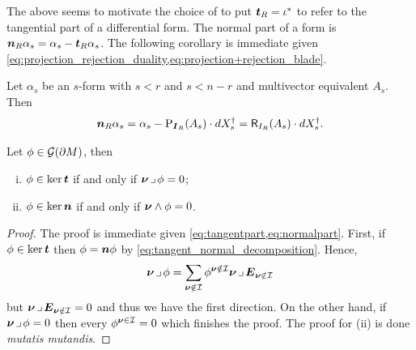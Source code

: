 \documentclass{article}
\begin{document}
The above seems to motivate the choice of \cite{schwarz_hodge_1995} to put $\boldsymbol{t}_R = \iota^*$ to refer to the tangential part of a differential form. The normal part of a form is $\boldsymbol{n}_R \alpha_s = \alpha_s - \boldsymbol{t}_R \alpha_s$. The following corollary is immediate given \cref{eq:projection_rejection_duality,eq:projection+rejection_blade}. 
\begin{corollary}
Let $\alpha_s$ be an $s$-form with $s<r$ and $s<n-r$ and multivector equivalent $A_s$. Then
\begin{equation}
\boldsymbol{n}_R \alpha_s = \alpha_s - \operatorname{P}_{\boldsymbol{I}_R}(A_s)\cdot dX_s^\dagger = \mathsf{R}_{I_R}(A_s)\cdot dX_s^\dagger.
\end{equation}
\end{corollary}

\begin{proposition}
\label{prop:tangent_normal_proposition}
Let $\phi \in \mathcal{G}({\partial M})$, then 
\begin{enumerate}[i.]
\item $\phi \in \ker \boldsymbol{t}$ if and only if $\boldsymbol{\nu} \hspace*{.5mm}\lrcorner \hspace*{.5mm} \phi = 0$;
\item $\phi \in \ker \boldsymbol{n}$ if and only if $\boldsymbol{\nu} \wedge \phi = 0$.
\end{enumerate}
\end{proposition}
\begin{proof}
The proof is immediate given \cref{eq:tangentpart,eq:normalpart}. First, if $\phi \in \ker \boldsymbol{t}$ then $\phi = \boldsymbol{n} \phi$ by \cref{eq:tangent_normal_decomposition}. Hence,
\begin{equation}
\boldsymbol{\nu} \hspace*{.5mm}\lrcorner \hspace*{.5mm} \phi = \sum_{{\boldsymbol{\nu} \notin \mathcal{I}} } \phi^{{\boldsymbol{\nu} \notin \mathcal{I}}} \boldsymbol{\nu} \hspace*{.5mm}\lrcorner \hspace*{.5mm} \boldsymbol{E}_{\boldsymbol{\nu} \notin \mathcal{I}}
\end{equation}
but $\boldsymbol{\nu} \hspace*{.5mm}\lrcorner \hspace*{.5mm} \boldsymbol{E}_{\boldsymbol{\nu} \notin \mathcal{I}} = 0$ and thus we have the first direction. On the other hand, if $\boldsymbol{\nu} \hspace*{.5mm}\lrcorner \hspace*{.5mm} \phi = 0$ then every $\phi^{\boldsymbol{\nu} \in \mathcal{I}}=0$ which finishes the proof. The proof for (ii) is done \emph{mutatis mutandis}.
\end{proof}
\end{document}
